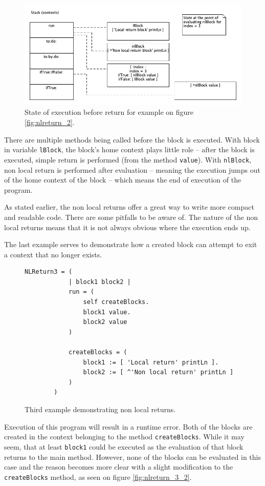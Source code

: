 \documentclass[thesis=M,english]{FITthesis}[2019/12/23]
\begin{document}
\begin{figure}[h!]
	\centering
	\includegraphics[width=\linewidth]{media/nlreturn_ex2.png}
	\caption{State of execution before return for example on figure \ref{fig:nlreturn_2}.}
	\label{fig:nlreturn_2_ctx}
\end{figure}

There are multiple methods being called before the block is executed. With block in variable \texttt{lBlock}, the
block's home context plays little role -- after the block is executed, simple return is performed (from the method
\texttt{value}). With \texttt{nlBlock}, non local return is performed after evaluation -- meaning the execution jumps
out of the home context of the block -- which means the end of execution of the program.

As stated earlier, the non local returns offer a great way to write more compact and readable code. There are some
pitfalls to be aware of. The nature of the non local returns means that it is not always obvious where the execution
ends up.

The last example serves to demonstrate how a created block can attempt to exit a context that no longer exists.

\begin{figure}[h!]
	\centering
	\begin{lstlisting}[language=Smalltalk]
		NLReturn3 = (
			| block1 block2 |
			run = (
				self createBlocks.
				block1 value.
				block2 value
			)

			createBlocks = (
				block1 := [ 'Local return' printLn ].
				block2 := [ ^'Non local return' printLn ]
			)
		)
	\end{lstlisting}
	\caption{Third example demonstrating non local returns.}
	\label{fig:nlreturn_3}
\end{figure}

Execution of this program will result in a runtime error. Both of the blocks are created in the context belonging to the method
\texttt{createBlocks}. While it may seem, that at least \texttt{block1} could be executed as the evaluation of that block
returns to the main method. However, none of the blocks can be evaluated in this case and the reason becomes more clear with a 
slight modification to the \texttt{createBlocks} method, as seen on figure \ref{fig:nlreturn_3_2}.
\end{document}
